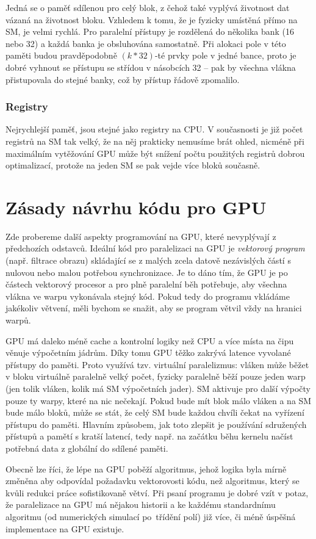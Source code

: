 Jedná se o paměť sdílenou pro celý blok, z čehož také vyplývá životnost dat vázaná na životnost bloku. Vzhledem k tomu, že je fyzicky umístěná přímo na SM, je velmi rychlá. Pro paralelní přístupy je rozdělená do několika bank (16 nebo 32) a každá banka je obsluhována samostatně. Při alokaci pole v této paměti budou pravděpodobně $(k*32)$-té prvky pole v jedné bance, proto je dobré vyhnout se přístupu se střídou v násobcích 32  -- pak by všechna vlákna přistupovala do stejné banky, což by přístup řádově zpomalilo.

\subsubsection{Registry}

Nejrychlejší paměť, jsou stejné jako registry na CPU. V současnosti je již počet registrů na SM tak velký, že na něj prakticky nemusíme brát ohled, nicméně při maximálním vytěžování GPU může být snížení počtu použitých registrů dobrou optimalizací, protože na jeden SM se pak vejde více bloků současně.

\section{Zásady návrhu kódu pro GPU}

Zde probereme další aspekty programování na GPU, které nevyplývají z předchozích odstavců. Ideální kód pro paralelizaci na GPU je \emph{vektorový program} (např. filtrace obrazu) skládající se z malých zcela datově nezávislých částí s nulovou nebo malou potřebou synchronizace. Je to dáno tím, že GPU je po částech vektorový procesor a pro plně paralelní běh potřebuje, aby všechna vlákna ve warpu vykonávala stejný kód. Pokud tedy do programu vkládáme jakékoliv větvení, měli bychom se snažit, aby se program větvil vždy na hranici warpů.

GPU má daleko méně cache a kontrolní logiky než CPU a více místa na čipu věnuje výpočetním jádrům. Díky tomu GPU těžko zakrývá latence vyvolané přístupy do paměti. Proto využívá tzv. virtuální paralelizmus: vláken může běžet v bloku virtuálně paralelně velký počet, fyzicky paralelně běží pouze jeden warp (jen tolik vláken, kolik má SM výpočetních jader). SM aktivuje pro další výpočty pouze ty warpy, které na nic nečekají. Pokud bude mít blok málo vláken a na SM bude málo bloků, může se stát, že celý SM bude každou chvíli čekat na vyřízení přístupu do paměti. Hlavním způsobem, jak toto zlepšit je používání sdružených přístupů a pamětí s kratší latencí, tedy např. na začátku běhu kernelu načíst potřebná data z globální do sdílené paměti.

Obecně lze říci, že lépe na GPU poběží algoritmus, jehož logika byla mírně změněna aby odpovídal požadavku vektorovosti kódu, než algoritmus, který se kvůli redukci práce sofistikovaně větví. Při psaní programu je dobré vzít v potaz, že paralelizace na GPU má nějakou historii a ke každému standardnímu algoritmu (od numerických simulací po~třídění polí) již více, či méně úspěšná implementace na GPU existuje.
